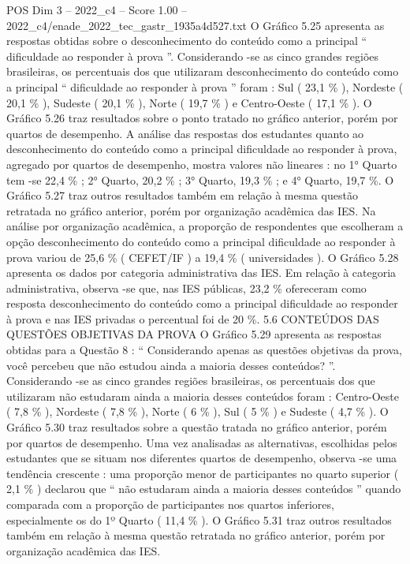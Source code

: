 \begin{textsample}{POS Dim 3 – 2022\_c4 – Score 1.00 – 2022\_c4/enade\_2022\_tec\_gastr\_1935a4d527.txt}
O Gráfico 5.25 apresenta as respostas obtidas sobre o desconhecimento do conteúdo como a principal “ dificuldade ao responder à prova ”.
Considerando -se as cinco grandes regiões brasileiras, os percentuais dos que utilizaram desconhecimento do conteúdo como a principal “ dificuldade ao responder à prova ” foram : Sul ( 23,1 \% ), Nordeste ( 20,1 \% ), Sudeste ( 20,1 \% ), Norte ( 19,7 \% ) e Centro-Oeste ( 17,1 \% ).
O Gráfico 5.26 traz resultados sobre o ponto tratado no gráfico anterior, porém por quartos de desempenho.
A análise das respostas dos estudantes quanto ao desconhecimento do conteúdo como a principal dificuldade ao responder à prova, agregado por quartos de desempenho, mostra valores não lineares : no 1{\EmojiFont °} Quarto tem -se 22,4 \% ; 2{\EmojiFont °} Quarto, 20,2 \% ; 3{\EmojiFont °} Quarto, 19,3 \% ; e 4{\EmojiFont °} Quarto, 19,7 \%.
O Gráfico 5.27 traz outros resultados também em relação à mesma questão retratada no gráfico anterior, porém por organização acadêmica das IES.
Na análise por organização acadêmica, a proporção de respondentes que escolheram a opção desconhecimento do conteúdo como a principal dificuldade ao responder à prova variou de 25,6 \% ( CEFET/IF ) a 19,4 \% ( universidades ).
O Gráfico 5.28 apresenta os dados por categoria administrativa das IES.
Em relação à categoria administrativa, observa -se que, nas IES públicas, 23,2 \% ofereceram como resposta desconhecimento do conteúdo como a principal dificuldade ao responder à prova e nas IES privadas o percentual foi de 20 \%. 5.6 CONTEÚDOS DAS QUESTÕES OBJETIVAS DA PROVA O Gráfico 5.29 apresenta as respostas obtidas para a Questão 8 : “ Considerando apenas as questões objetivas da prova, você percebeu que não estudou ainda a maioria desses conteúdos? ”.
Considerando -se as cinco grandes regiões brasileiras, os percentuais dos que utilizaram não estudaram ainda a maioria desses conteúdos foram : Centro-Oeste ( 7,8 \% ), Nordeste ( 7,8 \% ), Norte ( 6 \% ), Sul ( 5 \% ) e Sudeste ( 4,7 \% ).
O Gráfico 5.30 traz resultados sobre a questão tratada no gráfico anterior, porém por quartos de desempenho.
Uma vez analisadas as alternativas, escolhidas pelos estudantes que se situam nos diferentes quartos de desempenho, observa -se uma tendência crescente : uma proporção menor de participantes no quarto superior ( 2,1 \% ) declarou que “ não estudaram ainda a maioria desses conteúdos ” quando comparada com a proporção de participantes nos quartos inferiores, especialmente os do 1º Quarto ( 11,4 \% ).
O Gráfico 5.31 traz outros resultados também em relação à mesma questão retratada no gráfico anterior, porém por organização acadêmica das IES.

\end{textsample}
